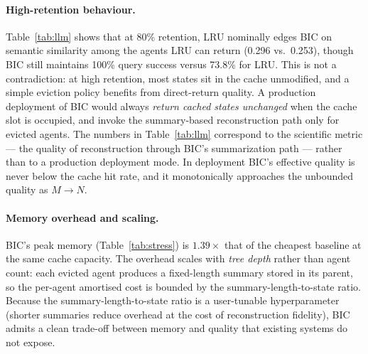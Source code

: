 \documentclass[fleqn,10pt]{article}
\theoremstyle{definition}
\newcommand{\slots}{M}
\begin{document}
\paragraph{High-retention behaviour.}
Table~\ref{tab:llm} shows that at 80\% retention, LRU nominally edges
BIC on semantic similarity among the agents LRU can return
(0.296 vs.\ 0.253), though BIC still maintains 100\% query success
versus 73.8\% for LRU. This is not a contradiction: at high
retention, most states sit in the cache unmodified, and a simple
eviction policy benefits from direct-return quality. A production
deployment of BIC would always \emph{return cached states unchanged}
when the cache slot is occupied, and invoke the summary-based
reconstruction path only for evicted agents. The numbers in
Table~\ref{tab:llm} correspond to the scientific metric --- the
quality of reconstruction through BIC's summarization path --- rather
than to a production deployment mode. In deployment BIC's effective
quality is never below the cache hit rate, and it monotonically
approaches the unbounded quality as $\slots \to N$.

\paragraph{Memory overhead and scaling.}
BIC's peak memory (Table~\ref{tab:stress}) is $1.39\times$ that of
the cheapest baseline at the same cache capacity. The overhead
scales with \emph{tree depth} rather than agent count: each evicted
agent produces a fixed-length summary stored in its parent, so the
per-agent amortised cost is bounded by the summary-length-to-state
ratio. Because the summary-length-to-state ratio is a user-tunable
hyperparameter (shorter summaries reduce overhead at the cost of
reconstruction fidelity), BIC admits a clean trade-off between memory
and quality that existing systems do not expose.
\end{document}
